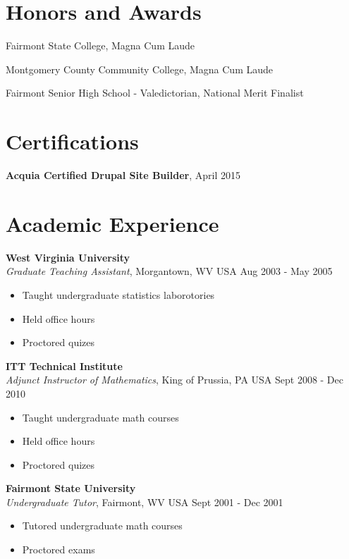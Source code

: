 \documentclass[margin,line]{res}
\begin{document}
\begin{resume}
\vspace*{0.2in}
\section{\sc Honors and Awards}

\vspace*{-2.5mm}
Fairmont State College, Magna Cum Laude

\vspace*{-2.5mm}
Montgomery County Community College, Magna Cum Laude

\vspace*{-2.5mm}
Fairmont Senior High School - Valedictorian, National Merit Finalist

\section{\sc Certifications}
{\bf Acquia Certified Drupal Site Builder}, April 2015

\section{\sc Academic Experience}
{\bf West Virginia University} \\
{\em Graduate Teaching Assistant}, Morgantown, WV USA \hfill Aug 2003 - May 2005
\begin{itemize}
\item Taught undergraduate statistics laborotories
\item Held office hours
\item Proctored quizes
\end{itemize}

{\bf ITT Technical Institute} \\
{\em Adjunct Instructor of Mathematics}, King of Prussia, PA USA \hfill Sept 2008 - Dec 2010
\begin{itemize}
\item Taught undergraduate math courses
\item Held office hours
\item Proctored quizes
\end{itemize}

{\bf Fairmont State University} \\
{\em Undergraduate Tutor}, Fairmont, WV USA \hfill Sept 2001 - Dec 2001
\begin{itemize}
\item Tutored undergraduate math courses
\item Proctored exams
\end{itemize}




\end{resume}
\end{document}
